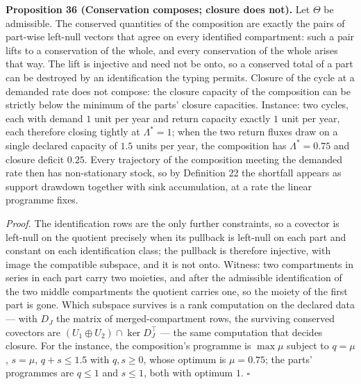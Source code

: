 \documentclass[11pt]{article}
\begin{document}
\textbf{Proposition 36 (Conservation composes; closure does not).} Let \(\Theta\) be admissible. The conserved quantities of the composition are exactly the pairs of part-wise left-null vectors that
agree on every identified compartment: such a pair lifts to a conservation of the whole, and every
conservation of the whole arises that way. The lift is injective and need not be onto, so a conserved total
of a part can be destroyed by an identification the typing permits. Closure of
the cycle at a demanded rate does not compose: the closure capacity of the composition can be strictly
below the minimum of the parts' closure capacities. Instance: two cycles, each with demand \(1\) unit
per year and return capacity exactly \(1\) unit per year, each therefore closing tightly at \(\Lambda^{*} = 1\); when the two return fluxes draw on a single declared capacity of \(1.5\) units per year, the composition has \(\Lambda^{*} = 0.75\) and closure deficit \(0.25\). Every trajectory of the
composition meeting the demanded rate then has non-stationary stock, so by Definition 22 the shortfall
appears as support drawdown together with sink accumulation, at a rate the linear programme fixes.

\emph{Proof.} The identification rows are the only further constraints, so a covector is left-null on the
quotient precisely when its pullback is left-null on each part and constant on each identification class;
the pullback is therefore injective, with image the compatible subspace, and it is not onto. Witness: two
compartments in series in each part carry two moieties, and after the admissible identification of the two
middle compartments the quotient carries one, so the moiety of the first part is gone. Which subspace
survives is a rank computation on the declared data --- with \(D_J\) the matrix of merged-compartment rows,
the surviving conserved covectors are \((U_1 \oplus U_2) \cap \ker D_J^{\top}\) --- the same computation
that decides closure. For the instance, the composition's programme is \(\max \mu\) subject to \(q = \mu\), \(s = \mu\), \(q + s \le 1.5\)
with \(q, s \ge 0\), whose optimum is \(\mu = 0.75\); the parts' programmes are \(q \le 1\) and \(s \le 1\), both with optimum \(1\). \ensuremath{\square}
\end{document}

